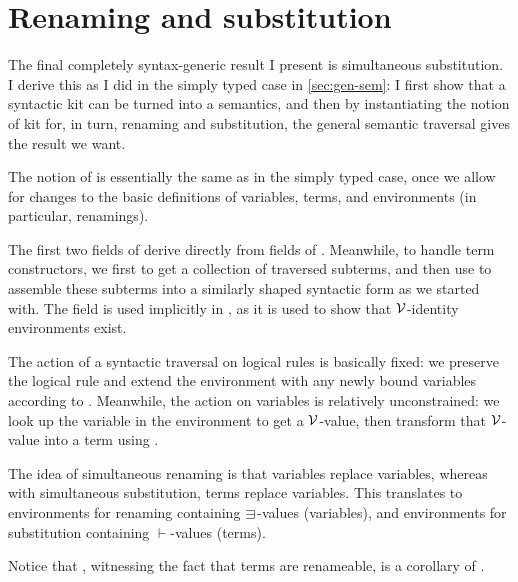 \section{Renaming and substitution}\label{sec:kit-to-sem}

The final completely syntax-generic result I present is simultaneous
substitution.
I derive this as I did in the simply typed case in \cref{sec:gen-sem}:
I first show that a syntactic kit can be turned into a semantics, and then by
instantiating the notion of kit for, in turn, renaming and substitution, the
general semantic traversal gives the result we want.

The notion of  is essentially the same as in the simply typed
case, once we allow for changes to the basic definitions of variables, terms,
and environments (in particular, renamings).


The first two fields of  derive directly from fields of
.
Meanwhile, to handle term constructors, we first  to get a
collection of traversed subterms, and then use 
to assemble these subterms into a similarly shaped syntactic form as we started
with.
The  field is used implicitly in , as it is
used to show that $\mathcal V$-identity environments exist.


The action of a syntactic traversal on logical rules is basically fixed: we
preserve the logical rule and extend the environment with any newly bound
variables according to .
Meanwhile, the action on variables is relatively unconstrained: we look up the
variable in the environment to get a $\mathcal V$-value, then transform that $\mathcal V$-value
into a term using .

The idea of simultaneous renaming is that variables replace variables, whereas
with simultaneous substitution, terms replace variables.
This translates to environments for renaming containing $\sqni$-values
(variables), and environments for substitution containing $\vdash$-values
(terms).



Notice that , witnessing the fact
that terms are renameable, is a corollary of .


